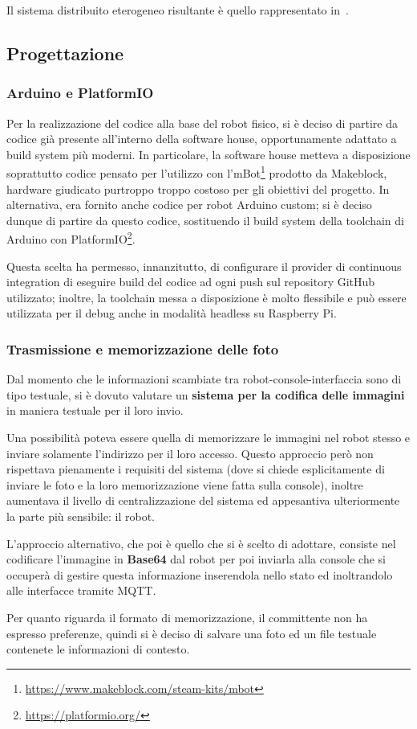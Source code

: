 Il sistema distribuito eterogeneo risultante è quello rappresentato in~.

\subsection{Progettazione}

\subsubsection{Arduino e PlatformIO}

Per la realizzazione del codice alla base del robot fisico, si è deciso di partire da codice già presente all'interno della software house, opportunamente adattato a build system più moderni.
In particolare, la software house metteva a disposizione soprattutto codice pensato per l'utilizzo con l'mBot\footnote{\url{https://www.makeblock.com/steam-kits/mbot}} prodotto da Makeblock, hardware giudicato purtroppo troppo costoso per gli obiettivi del progetto.
In alternativa, era fornito anche codice per robot Arduino custom; si è deciso dunque di partire da questo codice, sostituendo il build system della toolchain di Arduino con PlatformIO\footnote{\url{https://platformio.org/}}.

Questa scelta ha permesso, innanzitutto, di configurare il provider di continuous integration di eseguire build del codice ad ogni push sul repository GitHub utilizzato;
inoltre, la toolchain messa a disposizione è molto flessibile e può essere utilizzata per il debug anche in modalità headless su Raspberry Pi.

\subsubsection{Trasmissione e memorizzazione delle foto}

Dal momento che le informazioni scambiate tra robot-console-interfaccia sono di tipo testuale, si è dovuto valutare un \textbf{sistema per la codifica delle immagini} in maniera testuale per il loro invio.

Una possibilità poteva essere quella di memorizzare le immagini nel robot stesso e inviare solamente l'indirizzo per il loro accesso.
Questo approccio però non rispettava pienamente i requisiti del sistema (dove si chiede esplicitamente di inviare le foto e la loro memorizzazione viene fatta sulla console), inoltre aumentava il livello di centralizzazione del sistema ed appesantiva ulteriormente la parte più sensibile: il robot.

L'approccio alternativo, che poi è quello che si è scelto di adottare, consiste nel codificare l'immagine in \textbf{Base64} dal robot per poi inviarla alla console che si occuperà di gestire questa informazione inserendola nello stato ed inoltrandolo alle interfacce tramite MQTT\@.

Per quanto riguarda il formato di memorizzazione, il committente non ha espresso preferenze, quindi si è deciso di salvare una foto ed un file testuale contenete le informazioni di contesto.

